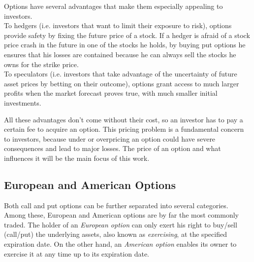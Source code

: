 \documentclass[a4paper,prd,twocolumn,nofootinbib,superscriptaddress,floatfix]{revtex4}
\begin{document}
Options have several advantages that make them especially appealing to investors.\\
To hedgers (i.e. investors that want to limit their exposure to risk), options provide safety by fixing the future price of a stock. If a hedger is afraid of a stock price crash in the future in one of the stocks he holds, by buying put options he ensures that his losses are contained because he can always sell the stocks he owns for the strike price.\\
To speculators (i.e. investors that take advantage of the uncertainty of future asset prices by betting on their outcome), options grant access to much larger profits when the market forecast proves true, with much smaller initial investments.

All these advantages don't come without their cost, so an investor has to pay a certain fee to acquire an option. This pricing problem is a fundamental concern to investors, because under or overpricing an option could have severe consequences and lead to major losses.
The price of an option and what influences it will be the main focus of this work.

\subsection{European and American Options}
Both call and put options can be further separated into several categories. Among these, European and American options are by far the most commonly traded.
The holder of an \textit{European option} can only exert his right to buy/sell (call/put) the underlying assets, also known as \textit{exercising}, at the specified expiration date.
On the other hand, an \textit{American option} enables its owner to exercise it at any time up to its expiration date.
\end{document}
